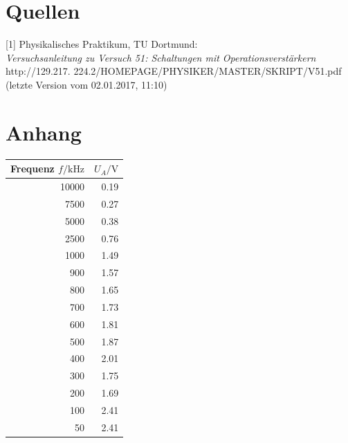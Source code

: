 \documentclass[]{scrartcl}
\let\oldsection\section
\renewcommand\section{\clearpage\oldsection}
\begin{document}
\section{Quellen}
{[1]} Physikalisches Praktikum, TU Dortmund: \\
\textit{Versuchsanleitung zu Versuch 51: Schaltungen mit Operationsverstärkern}\\
http://129.217.
224.2/HOMEPAGE/PHYSIKER/MASTER/SKRIPT/V51.pdf (letzte Version vom 02.01.2017, 11:10)\\

\section{Anhang}
\begin{table}[H]
	\centering
	\label{tab:integrator}
	\hskip-1.50cm
	\begin{tabular}{r r}
		\toprule
		Frequenz $f / \si{\kilo\hertz}$ & $U_A / \si{\volt}$ \\
		\midrule
		10000 & 0.19 \\
		7500  & 0.27 \\
		5000  & 0.38 \\
		2500  & 0.76 \\
		1000  & 1.49 \\
		900   & 1.57 \\
		800   & 1.65 \\
		700   & 1.73 \\
		600   & 1.81 \\
		500   & 1.87 \\
		400   & 2.01 \\
		300   & 1.75 \\
		200   & 1.69 \\
		100   & 2.41 \\
		50    & 2.41 \\
		\bottomrule
	\end{tabular}
\end{table}
\end{document}
